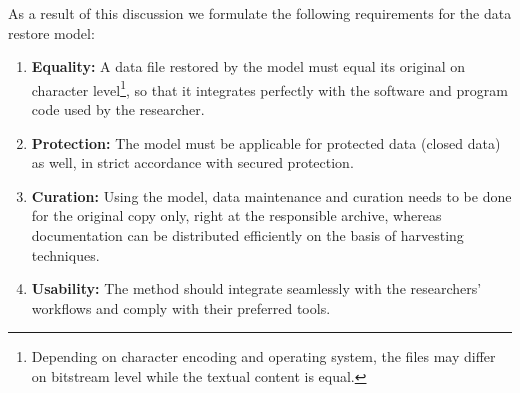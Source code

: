 \documentclass{sig-alternate}
\begin{document}
As a result of this discussion we formulate the following requirements for the data restore model:



\begin{enumerate}\label{reqlist}
	
  \item \textbf{Equality:} A data file restored by the model must equal its original on character level\footnote{Depending on character encoding and operating system, the files may differ on bitstream level while the textual content is equal.}, so that it integrates perfectly with the software and program code used by the researcher.
  
  \item \textbf{Protection:} The model must be applicable for protected data (closed data) as well, in strict accordance with secured protection.
 
  \item \textbf{Curation:} Using the model, data maintenance and curation needs to be done for the original copy only, right at the responsible archive, whereas documentation can be distributed efficiently on the basis of harvesting techniques.

  
  \item \textbf{Usability:} The method should integrate seamlessly with the researchers' workflows and comply with their preferred tools. 
  

\end{enumerate}
\end{document}

